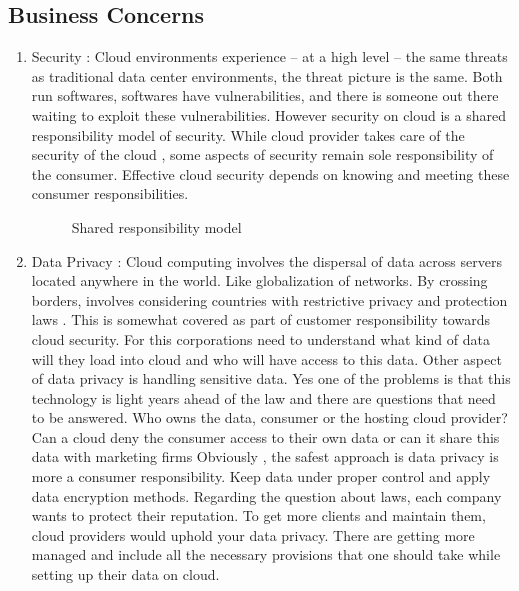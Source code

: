 \documentclass[journal]{hybrid-cloud}
\begin{document}
\subsection{Business Concerns}
\begin{enumerate}
	\item Security  : Cloud environments experience – at a high level – the same threats as traditional data center environments, the threat picture is the same. Both run softwares, softwares have vulnerabilities, and there is someone out there waiting to exploit these vulnerabilities. However security on cloud is a shared responsibility model of security. While cloud provider takes care of the security of the cloud , some aspects of security remain sole responsibility of the consumer. Effective cloud security depends
on knowing and meeting these consumer responsibilities.  \cite{cloudno}

\begin{figure}[h]
	\caption{\label{fig:shared_responsibility_model} Shared responsibility model}%
\end{figure}

	\item Data Privacy : Cloud computing involves the dispersal of data across servers located anywhere in
the world. Like globalization of networks. By crossing borders, involves considering
countries with restrictive privacy and protection laws . This is somewhat covered as
part of customer responsibility towards cloud security. For this corporations need to
understand what kind of data will they load into cloud and who will have access to
this data. \cite{DataPrivacy}
Other aspect of data privacy is handling sensitive data. Yes one of the problems is
that this technology is light years ahead of the law and there are questions that need
to be answered. Who owns the data, consumer or the hosting cloud provider? Can
a cloud deny the consumer access to their own data or can it share this data with
marketing firms Obviously , the safest approach is data privacy is more a consumer
responsibility. Keep data under proper control and apply data encryption methods.
Regarding the question about laws, each company wants to protect their reputation.
To get more clients and maintain them, cloud providers would uphold your data
privacy. There are getting more managed and include all the necessary provisions
that one should take while setting up their data on cloud. \cite{DataPrivacy2} 


\end{enumerate}
\end{document}
